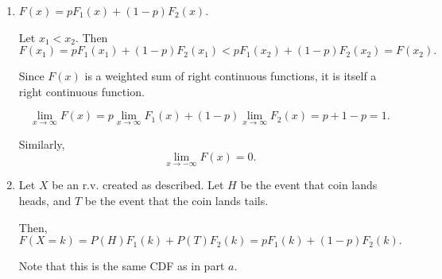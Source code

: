 \begin{enumerate}[label=(\alph*)]
\item
$F(x) = pF_{1}(x) + (1-p)F_{2}(x)$.

Let $x_{1} < x_{2}$. Then $$F(x_{1}) = pF_{1}(x_{1}) + (1-p)F_{2}(x_{1}) < pF_
{1}(x_{2}) + (1-p)F_{2}(x_{2}) = F(x_{2}).$$

Since $F(x)$ is a weighted sum of right continuous functions, it is itself a
right continuous function.

$$\lim_{x \to \infty} F(x) = p\lim_{x \to \infty} F_{1}(x) + (1 - p)\lim_{x \to
\infty} F_{2}(x) = p + 1 - p = 1.$$

Similarly, $$\lim_{x \to -\infty}F(x) = 0.$$

\item
Let $X$ be an r.v. created as described. Let $H$ be the event that coin
lands heads, and $T$ be the event that the coin lands tails.

Then, $F(X=k) = P(H)F_{1}(k) + P(T)F_{2}(k) = pF_{1}(k) + (1-p)F_{2}(k).$

Note that this is the same CDF as in part $a$.
\end{enumerate}